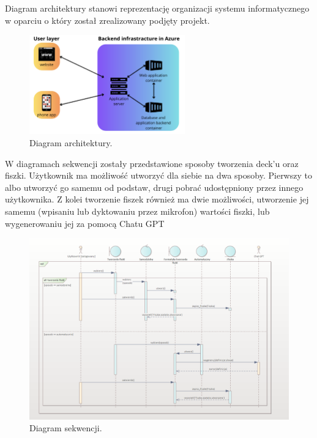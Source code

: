 \indent Diagram architektury stanowi reprezentację organizacji systemu informatycznego w oparciu o który został zrealizowany podjęty projekt.


\begin{figure}[H]
    \centering
    \includegraphics[width=0.6\textwidth]{chapters/chapter_6/diagram_architektury}
    \caption{Diagram architektury.}
    \label{img:diagram_architektury}
\end{figure}


\setlength{\parindent}{15pt}

\indent W diagramach sekwencji zostały przedstawione sposoby tworzenia deck’u oraz fiszki. Użytkownik ma możliwość utworzyć dla siebie na dwa sposoby. Pierwszy to albo utworzyć go samemu od podstaw, drugi pobrać udostępniony przez innego użytkownika. Z kolei tworzenie fiszek również ma dwie możliwości, utworzenie jej samemu (wpisaniu lub dyktowaniu przez mikrofon) wartości fiszki, lub wygenerowaniu jej za pomocą Chatu GPT

    \begin{figure}[H]
    \centering
    \includegraphics[width=1\textwidth]{chapters/chapter_6/diagram_sekwencji}
    \caption{Diagram sekwencji.}
    \label{img:diagram_sekwencji}
\end{figure}


    


